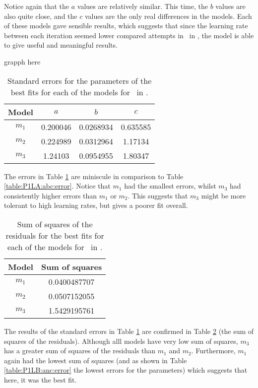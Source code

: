 Notice again that the $a$ values are relatively similar.
This time, the $b$ values are also quite close, and the $c$ values are the only
real differences in the models.
Each of these models gave sensible results, which suggests that since the
learning rate between each iteration seemed lower compared attempts in \PO\ in
\LB, the model is able to give useful and meaningful results.

\FIXME grapph here

\begin{table}[ht!]
\centering
\begin{tabular}{|c|c|c|c|}
\hline
{\bf Model} &  $a$ & $b$ & $c$ \\
\hline
$m_1$ & 0.200046 & 0.0268934 & 0.635585 \\
\hline
$m_2$ & 0.224989 & 0.0312964 & 1.17134\\
\hline
$m_3$ & 1.24103 & 0.0954955 & 1.80347 \\
\hline
\end{tabular}
\caption{Standard errors for the parameters of the best fits for each of the models for \PO\ in \LB.}
\label{table:P1LB:abc:error}
\end{table}

The errors in Table \ref{table:P1LB:abc:error} are miniscule in comparison to
Table \ref{table:P1LA:abc:error}.
Notice that $m_1$ had the smallest errors, whilst $m_3$ had consistently higher
errors than $m_1$ or $m_2$.
This suggests that $m_3$ might be more tolerant to high learning rates, but
gives a poorer fit overall.

\begin{table}[ht!]
\centering
\begin{tabular}{|c|c|}
\hline
{\bf Model} & Sum of squares \\
\hline
$m_1$ & 0.0400487707\\
\hline
$m_2$ & 0.0507152055\\
\hline
$m_3$ & 1.5429195761\\
\hline
\end{tabular}
\caption{Sum of squares of the residuals for the best fits for each of the models for \PO\ in \LB.}
\label{table:P1LB:abc:sumsquares}
\end{table}

The results of the standard errors in Table \ref{table:P1LB:abc:error} are
confirmed in Table \ref{table:P1LB:abc:sumsquares} (the sum of squares of the
residuals).
Although alll models have very low sum of squares, $m_3$ has a greater sum of
squares of the residuals than $m_1$ and $m_2$.
Furthermore, $m_1$ again had the lowest sum of squares (and as shown in Table
\ref{table:P1LB:anc:error} the lowest errors for the parameters) which suggests
that here, it was the best fit.

